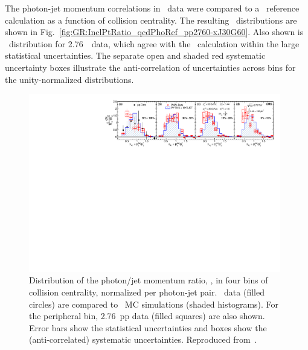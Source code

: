 The photon-jet momentum correlations in \PbPb\ data were compared to a \PYTHYD\ reference
calculation as a function of collision centrality. The resulting
\xjg\ distributions are shown in Fig.~\ref{fig:GR:InclPtRatio_qcdPhoRef_pp2760-xJ30G60}.
Also shown is \avexjg\ distribution for 2.76\TeV\ \pp\ data, which agree
with the \PYTHYD\ calculation within the large statistical uncertainties.
The separate open and shaded red systematic uncertainty boxes illustrate the
anti-correlation of uncertainties across bins for the unity-normalized distributions.

\begin{figure}[!ht]
\begin{center}
\includegraphics[width=0.98\textwidth]{jetfigures/Photonv7_Paper_InclPtRatio_all_cent4_G60J30_subDPhi1SS1_Isol0_Norm1log1.pdf}
\caption[]{\label{fig:GR:InclPtRatio_qcdPhoRef_pp2760-xJ30G60} Distribution of the photon/jet 
momentum ratio, \xjg, in four bins of collision centrality, normalized per 
photon-jet pair. \PbPb\ data (filled circles) are compared to \PYTHYD\ MC simulations
(shaded histograms). For the peripheral bin,  2.76\TeV\ pp data (filled squares)
are also shown.  Error bars show the statistical uncertainties and
boxes show the (anti-correlated) systematic uncertainties. Reproduced from~\cite{Chatrchyan:2012gt}.}
\label{fig:GR:CMS_xjg}
\end{center}
\end{figure}

